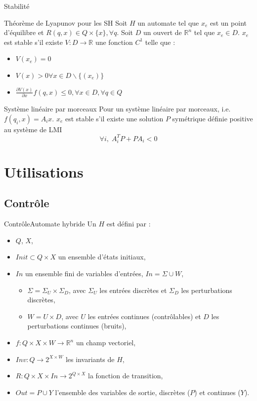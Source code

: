 \documentclass[compress]{beamer}
\begin{document}
\begin{frame}{Stabilité}
\begin{block}{Théorème de Lyapunov pour les SH}
Soit $H$ un automate tel que $x_e$ est un point d'équilibre et $R(q,x) \in Q \times \{x\}, \forall q$.
Soit $D$ un ouvert de $\mathbb{R}^n$ tel que $x_e \in D$. $x_e$ est stable s'il existe $V : D \rightarrow \mathbb{R}$ une fonction $C^1$ telle que :
\begin{itemize}
\item $V(x_e) = 0$
\item $V(x) > 0 \forall x \in D \backslash \{(x_e)\}$
\item $\frac{\partial V(x)}{\partial x} f(q,x) \leq 0, \forall x \in D, \forall q \in Q$
\end{itemize}
\end{block}
\begin{block}{Système linéaire par morceaux}
Pour un système linéaire par morceaux, i.e. $f(q_i, x) = A_i x$. $x_e$ est stable s'il existe une solution $P$ symétrique définie positive au système de LMI
	$$\forall i, \; A_i^T P + P A_i < 0$$
\end{block}
\end{frame}

\section{Utilisations}
\begin{frame}
\tableofcontents[currentsection]
\end{frame}

\subsection{Contrôle}
\begin{frame}{Contrôle}{Automate hybride}
Un  $H$ est défini par :
\begin{itemize}
\item $Q$, $X$,
\item $Init \subset Q \times X$ un ensemble d'états initiaux,
\item $In$ un ensemble fini de variables d'entrées, $In = \Sigma \cup W$,
	\begin{itemize}
	\item $\Sigma = \Sigma_U \times \Sigma_D$, avec $\Sigma_U$ les entrées discrètes et $\Sigma_D$ les perturbations discrètes,
	\item $W = U \times D$, avec $U$ les entrées continues (contrôlables) et $D$ les perturbations continues (bruits),
	\end{itemize}
\item $f : Q \times X \times W \rightarrow \mathbb{R}^n$ un champ vectoriel,
\item $Inv : Q \rightarrow 2^{X \times W}$ les invariants de $H$,
\item $R : Q \times X \times In \rightarrow 2^{Q \times X}$ la fonction de transition,
\item $Out = P \cup Y$ l'ensemble des variables de sortie, discrètes ($P$) et continues ($Y$).
\end{itemize}
\end{frame}
\end{document}

